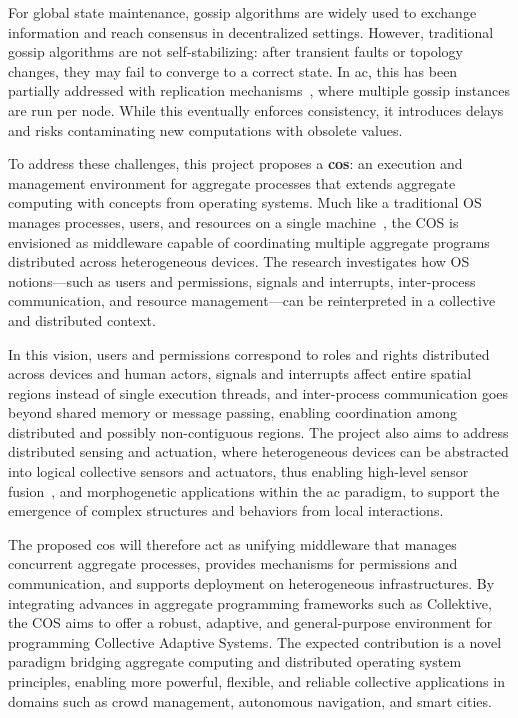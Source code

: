 \documentclass[runningheads]{llncs}
\begin{document}
    For global state maintenance,
    gossip algorithms are widely used to exchange information and reach consensus in decentralized settings.
%
    However,
    traditional gossip algorithms are not self-stabilizing:
    after transient faults or topology changes,
    they may fail to converge to a correct state.
%
    In \ac{ac},
    this has been partially addressed with replication mechanisms~\cite{PianiniCoordination2016},
    where multiple gossip instances are run per node.
%
    While this eventually enforces consistency,
    it introduces delays and risks contaminating new computations with obsolete values.

    To address these challenges,
    this project proposes a \textbf{\ac{cos}}:
    an execution and management environment for aggregate processes
    that extends aggregate computing with concepts from operating systems.
%
    Much like a traditional OS manages processes, users, and resources on a single machine~\cite{DBLP:journals/csur/TanenbaumR85},
    the COS is envisioned as middleware capable of coordinating multiple aggregate programs distributed across heterogeneous devices.
%
    The research investigates how OS notions---such as users and permissions, signals and interrupts,
    inter-process communication, and resource management---can be reinterpreted in a collective and distributed context.

    In this vision,
    users and permissions correspond to roles and rights distributed across devices and human actors,
    signals and interrupts affect entire spatial regions instead of single execution threads,
    and inter-process communication goes beyond shared memory or message passing,
    enabling coordination among distributed and possibly non-contiguous regions.
%
    The project also aims to address distributed sensing and actuation,
    where heterogeneous devices can be abstracted into logical collective sensors and actuators,
    thus enabling high-level sensor fusion~\cite{DBLP:journals/arc/Sasiadek02},
    and morphogenetic applications within the \ac{ac} paradigm,
    to support the emergence of complex structures and behaviors from local interactions.

    The proposed \ac{cos} will therefore act as unifying middleware that manages concurrent aggregate processes,
    provides mechanisms for permissions and communication,
    and supports deployment on heterogeneous infrastructures.
%
    By integrating advances in aggregate programming frameworks such as Collektive,
    the COS aims to offer a robust, adaptive,
    and general-purpose environment for programming Collective Adaptive Systems.
%
    The expected contribution is a novel paradigm bridging aggregate computing and distributed operating system principles,
    enabling more powerful, flexible,
    and reliable collective applications in domains such as crowd management, autonomous navigation, and smart cities.
\end{document}
